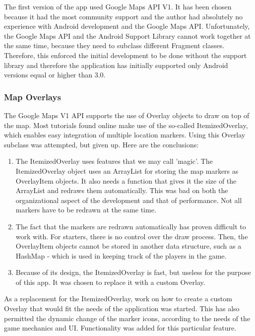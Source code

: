 The first version of the app used Google Maps API V1. It has been chosen
because it had the most community support and the author had absolutely no
experience with Android development and the Google Maps API.  Unfortunately, the
Google Maps API and the Android Support Library cannot work together at the same
time, because they need to subclass different Fragment classes. Therefore, this
enforced the initial development to be done without the support library and
therefore the application has initially supported only Android versions equal or
higher than 3.0.

\subsubsection{Map Overlays}

The Google Maps V1 API supports the use of Overlay objects to draw on top
of the map. Most tutorials found online make use of the so-called
ItemizedOverlay, which enables easy integration of multiple location markers.
Using this Overlay subclass was attempted, but given up. Here are the
conclusions: \newline
\begin{enumerate}
  \item The ItemizedOverlay uses features that we may call 'magic'. The
  ItemizedOverlay object uses an ArrayList for storing the map markers as
  OverlayItem objects. It also needs a function that gives it the size of the
  ArrayList and redraws them automatically. This was bad on both the
  organizational aspect of the development and that of performance. Not all
  markers have to be redrawn at the same time.
  
  \item The fact that the markers are redrawn automatically has proven difficult
  to work with. For starters, there is no control over the draw process. Then,
  the OverlayItem objects cannot be stored in another data structure, such as a
  HashMap - which is used in keeping track of the players in the game.
  
  \item Because of its design, the ItemizedOverlay is fast, but useless for the
  purpose of this app. It was chosen to replace it with a custom Overlay.   
\end{enumerate}

As a replacement for the ItemizedOverlay, work on how to create a custom Overlay
that would fit the needs of the application was started. This has also permitted
the dynamic change of the marker icons, according to the needs of the game
mechanics and UI. Functionality was added for this particular feature. \newline

